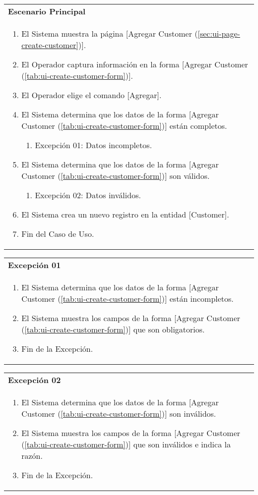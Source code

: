 	\begin{tabular}{ p{15.5cm} }
		\textbf{Escenario Principal} \\
		\begin{enumerate}
			\item El Sistema muestra la p\'agina [Agregar Customer (\ref{sec:ui-page-create-customer})].
			\item El Operador captura informaci\'on en la forma [Agregar Customer (\ref{tab:ui-create-customer-form})].
			\item El Operador elige el comando [Agregar].
			\item El Sistema determina que los datos de la forma [Agregar Customer (\ref{tab:ui-create-customer-form})] est\'an completos.
				\begin{enumerate}
					\item Excepci\'on 01: Datos incompletos.
				\end{enumerate}
			\item El Sistema determina que los datos de la forma [Agregar Customer (\ref{tab:ui-create-customer-form})] son v\'alidos.
				\begin{enumerate}
					\item Excepci\'on 02: Datos inv\'alidos.
				\end{enumerate}
			\item El Sistema crea un nuevo registro en la entidad [Customer].
			\item Fin del Caso de Uso.
		\end{enumerate}
	\end{tabular}
	
	\begin{tabular}{ p{15.5cm} }
		\textbf{Excepci\'on 01} \\
		\begin{enumerate}
			\item El Sistema determina que los datos de la forma [Agregar Customer (\ref{tab:ui-create-customer-form})] est\'an incompletos.
			\item El Sistema muestra los campos de la forma [Agregar Customer (\ref{tab:ui-create-customer-form})] que son obligatorios.
			\item Fin de la Excepci\'on.
		\end{enumerate}
	\end{tabular}
	
	\begin{tabular}{ p{15.5cm} }
		\textbf{Excepci\'on 02} \\
		\begin{enumerate}
			\item El Sistema determina que los datos de la forma [Agregar Customer (\ref{tab:ui-create-customer-form})] son inv\'alidos.
			\item El Sistema muestra los campos de la forma [Agregar Customer (\ref{tab:ui-create-customer-form})] que son inv\'alidos e indica la raz\'on.
			\item Fin de la Excepci\'on.
		\end{enumerate}
	\end{tabular}
	
